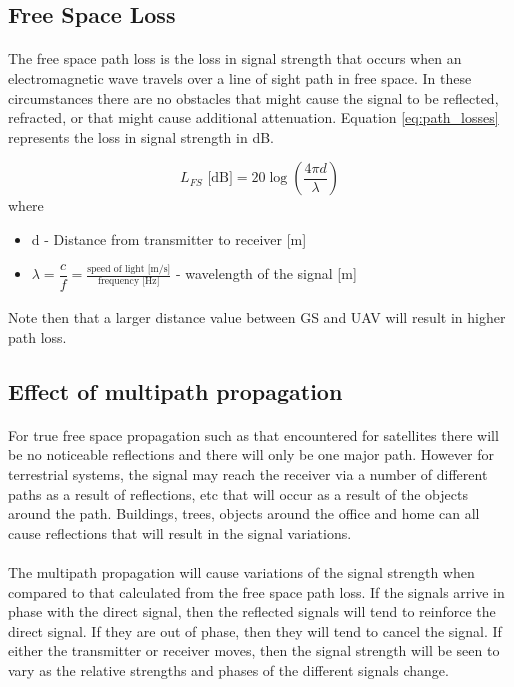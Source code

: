 \subsection{Free Space Loss}\label{subsec:path_loss}
\paragraph{}
The free space path loss is the loss in signal strength that occurs when an electromagnetic wave travels over a line of sight path in free space. In these circumstances there are no obstacles that might cause the signal to be reflected, refracted, or that might cause additional attenuation. Equation \ref{eq:path_losses} represents the loss in signal strength in dB.

\begin{equation}\label{eq:path_losses}
	L_{FS}\text{ [dB]} = 20\log\left (\frac{4\pi d}{\lambda} \right)
\end{equation}
where
\begin{itemize}
	\item d - Distance from transmitter to receiver [m]
	\item $\lambda  = \dfrac{c}{f} = \frac{\text{speed of light [m/s]}}{\text{frequency [Hz]}}$ - wavelength of the signal [m]
\end{itemize}

\paragraph{} Note then that a larger distance value between GS and UAV will result in higher path loss.

\subsection*{Effect of multipath propagation}
\paragraph{}For true free space propagation such as that encountered for satellites there will be no noticeable reflections and there will only be one major path. However for terrestrial systems, the signal may reach the receiver via a number of different paths as a result of reflections, etc that will occur as a result of the objects around the path. Buildings, trees, objects around the office and home can all cause reflections that will result in the signal variations.

\paragraph{}The multipath propagation will cause variations of the signal strength when compared to that calculated from the free space path loss. If the signals arrive in phase with the direct signal, then the reflected signals will tend to reinforce the direct signal. If they are out of phase, then they will tend to cancel the signal. If either the transmitter or receiver moves, then the signal strength will be seen to vary as the relative strengths and phases of the different signals change.